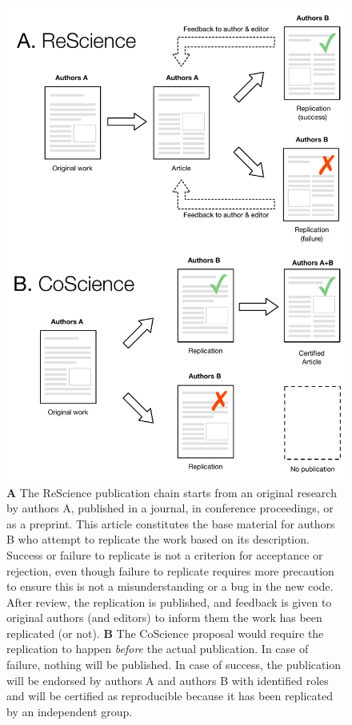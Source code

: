 \documentclass[a4paper,10pt, twocolumn]{article}
\begin{document}

\begin{figure}
  \includegraphics[width=1.0\columnwidth]{CoScience}
  \caption{\textbf{A} The ReScience publication chain starts from an
    original research by authors A, published in a journal, in
    conference proceedings, or as a preprint. This article constitutes
    the base material for authors B who attempt to replicate the work
    based on its description. Success or failure to replicate is not a
    criterion for acceptance or rejection, even though failure to
    replicate requires more precaution to ensure this is not a
    misunderstanding or a bug in the new code. After review, the
    replication is published, and feedback is given to original
    authors (and editors) to inform them the work has been replicated
    (or not). \textbf{B} The CoScience proposal would require the
    replication to happen \textit{before} the actual publication. In
    case of failure, nothing will be published. In case of success,
    the publication will be endorsed by authors A and authors B with
    identified roles and will be certified as reproducible because it
    has been replicated by an independent group.}
\end{figure}
\end{document}
